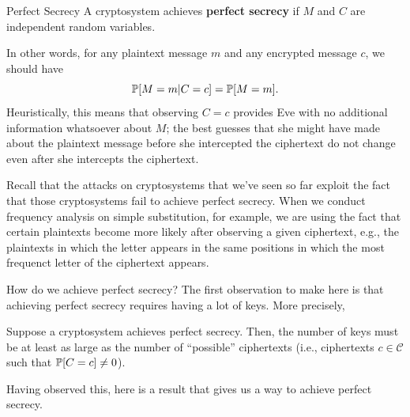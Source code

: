 \documentclass[letterpaper]{article}
\begin{document}
\begin{definition}{Perfect Secrecy}{}
    A cryptosystem achieves \textbf{perfect secrecy} if $M$ and $C$ are independent random variables. 
\end{definition}
In other words, for any plaintext message $m$ and any encrypted message $c$, we should have 
\[\mathbb{P}[M = m | C = c] = \mathbb{P}[M = m].\]
Heuristically, this means that observing $C = c$ provides Eve with no additional information whatsoever about $M$; the best guesses that she might have made about the plaintext message before she intercepted the ciphertext do not change even after she intercepts the ciphertext. 

\bigskip 

Recall that the attacks on cryptosystems that we've seen so far exploit the fact that those cryptosystems fail to achieve perfect secrecy. When we conduct frequency analysis on simple substitution, for example, we are using the fact that certain plaintexts become more likely after observing  a given ciphertext, e.g., the plaintexts in which the letter  appears in the same positions in which the most frequenct letter of the ciphertext appears. 

\bigskip 

How do we achieve perfect secrecy? The first observation to make here is that achieving perfect secrecy requires having a lot of keys. More precisely, 

\begin{lemma}{}{}
    Suppose a cryptosystem achieves perfect secrecy. Then, the number of keys must be at least as large as the number of ``possible'' ciphertexts (i.e., ciphertexts $c \in \mathscr{C}$ such that $\mathbb{P}[C = c] \neq 0$).
\end{lemma}

Having observed this, here is a result that gives us a way to achieve perfect secrecy.
\end{document}
